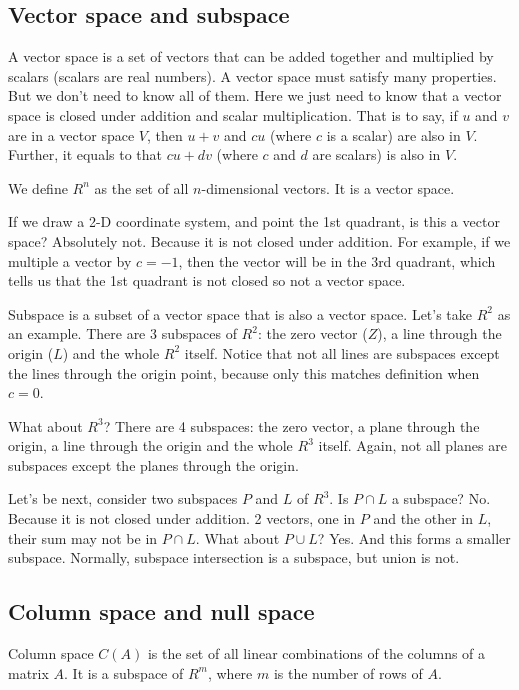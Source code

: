 \documentclass[12pt]{ctexart}
\begin{document}
\fontsize{12}{14}
\newpage
\subsection{\textbf{Vector space and subspace}}

A vector space is a set of vectors that can be added together and multiplied by scalars
(scalars are real numbers). A vector space must satisfy many properties. But we don't
need to know all of them. Here we just need to know that a vector space is closed under
addition and scalar multiplication. That is to say, if $u$ and $v$ are in a vector space
$V$, then $u + v$ and $cu$ (where $c$ is a scalar) are also in $V$. Further, it equals
to that $cu + dv$ (where $c$ and $d$ are scalars) is also in $V$.

We define $R^{n}$ as the set of all $n$-dimensional vectors. It is a vector space.

If we draw a 2-D coordinate system, and point the 1st quadrant, is this a vector space?
Absolutely not. Because it is not closed under addition. For example, if we multiple a
vector by $c = -1$, then the vector will be in the 3rd quadrant, which tells us that
the 1st quadrant is not closed so not a vector space.

Subspace is a subset of a vector space that is also a vector space. Let's take $R^{2}$
as an example. There are 3 subspaces of $R^{2}$: the zero vector ($Z$), a line through
the origin ($L$) and the whole $R^{2}$ itself. Notice that not all lines are subspaces
except the lines through the origin point, because only this matches definition when
$c = 0$.

What about $R^{3}$? There are 4 subspaces: the zero vector, a plane through the origin,
a line through the origin and the whole $R^{3}$ itself. Again, not all planes are
subspaces except the planes through the origin.

Let's be next, consider two subspaces $P$ and $L$ of $R^{3}$. Is $P \cap L$ a subspace?
No. Because it is not closed under addition. 2 vectors, one in $P$ and the other in $L$,
their sum may not be in $P \cap L$. What about $P \cup L$? Yes. And this forms a smaller
subspace. Normally, subspace intersection is a subspace, but union is not.

\subsection{\textbf{Column space and null space}}

Column space $C(A)$ is the set of all linear combinations of the columns of a matrix
$A$. It is a subspace of $R^{m}$, where $m$ is the number of rows of $A$.
\end{document}
